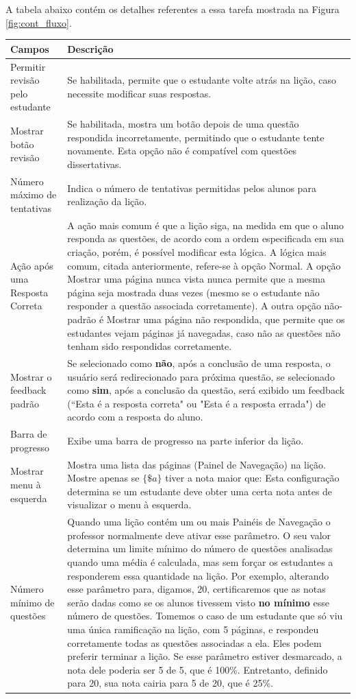 A tabela abaixo contém os detalhes referentes a essa tarefa mostrada na Figura \ref{fig:cont_fluxo}.
\begin{longtable}{p{4cm}|p{11cm}}
   \hline
 \rowcolor[rgb]{0.8,0.8,0.8} \textbf{Campos} &  \textbf{Descrição}\\\hline
  {Permitir revisão pelo estudante} & Se habilitada, permite que o estudante volte atrás na lição, caso necessite modificar suas respostas.\\\hline
  {Mostrar botão revisão} & Se habilitada, mostra um botão depois de uma questão respondida incorretamente, permitindo que o estudante tente novamente. Esta opção não é compatível com questões dissertativas.\\\hline
  {Número máximo de tentativas} & Indica o número de tentativas permitidas pelos alunos para realização da lição.\\\hline
  {Ação após uma Resposta Correta} & A ação mais comum é que a lição siga, na medida em que o aluno responda as questões, de acordo com a ordem especificada em sua criação, porém, é possível modificar esta lógica. A lógica mais comum, citada anteriormente, refere-se à opção Normal. A opção Mostrar uma página nunca vista nunca permite que a mesma página seja mostrada duas vezes (mesmo se o estudante não responder a questão associada corretamente). A outra opção não-padrão é Mostrar uma página não respondida, que permite que os estudantes vejam páginas já navegadas, caso não as questões não tenham sido respondidas corretamente.\\\hline
  {Mostrar o feedback padrão} & Se selecionado como \textbf{não}, após a conclusão de uma resposta, o usuário será redirecionado para próxima questão, se selecionado como \textbf{sim}, após a conclusão da questão, será exibido um feedback (“Esta é a resposta correta" ou "Esta é a resposta errada") de acordo com a resposta do aluno.\\\hline
  {Barra de progresso} & Exibe uma barra de progresso na parte inferior da lição.\\\hline
  {Mostrar menu à esquerda} & Mostra uma lista das páginas (Painel de Navegação) na lição. Mostre apenas se $\{\$a\}$ tiver a nota maior que: Esta configuração determina se um estudante deve obter uma certa nota antes de visualizar o menu à esquerda.\\\hline
  {Número mínimo de questões} & Quando uma lição contém um ou mais Painéis de Navegação o professor normalmente deve ativar esse parâmetro. O seu valor determina um limite mínimo do número de questões analisadas quando uma média é calculada, mas sem forçar os estudantes a responderem essa quantidade na lição. Por exemplo, alterando esse parâmetro para, digamos, 20, certificaremos que as notas serão dadas como se os alunos tivessem visto \textbf{no mínimo} esse número de questões. Tomemos o caso de um estudante que só viu uma única ramificação na lição, com 5 páginas, e respondeu corretamente todas as questões associadas a ela. Eles podem preferir terminar a lição. Se esse parâmetro estiver desmarcado, a nota dele poderia ser 5 de 5, que é 100\%. Entretanto, definido para 20, sua nota cairia para 5 de 20, que é 25\%.\\\hline

\end{longtable}

